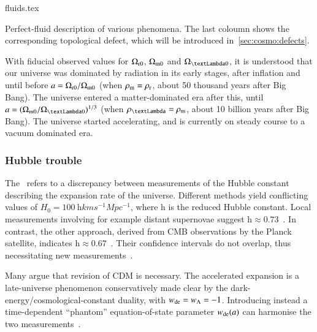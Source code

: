 \begin{table}[h]
    {{fluids.tex}
    \caption{Perfect-fluid description of various phenomena. The last coloumn shows the corresponding topological defect, which will be introduced in~\cref{sec:cosmo:defects}.}
    \label{tab:GR:lcdm:fluids}}
\end{table}

With fiducial observed values for $\Omega_\mathrm{r0}$, $\Omega_\mathrm{m0}$ and $\Omega_{\text{\textLambda}0}$, it is understood that our universe was dominated by radiation in its early stages, after inflation and until before $a=\Omega_\mathrm{r0}/\Omega_\mathrm{m0}$ (when $\rho_\mathrm{m}=\rho_\mathrm{r}$, about 50 thousand years after Big Bang). The universe entered a matter-dominated era after this, until $a=(\Omega\ped{m0}/\Omega_{\text{\textLambda}0})^{1/3}$ (when $\rho_{\text{\textLambda}}=\rho\ped{m}$, about 10 billion years after Big Bang). The universe started accelerating, and is currently on steady course to a vacuum dominated era. 


\subsubsection{Hubble trouble}
    The~ refers to a discrepancy between measurements of the Hubble constant describing the expansion rate of the universe. Different methods yield conflicting values of $H_0 = 100~ \mathrm{h} \unit{km} \unit{s^{-1}} \unit{Mpc^{-1}}$, where $\mathrm{h}$ is the reduced Hubble constant. Local measurements involving for example distant supernovae suggest $\mathrm{h} \approx 0.73$~\citep[e.g.][]{maggioreGravitationalWavesVol2018}. In contrast, the other approach, derived from CMB observations by the Planck satellite, indicates $\mathrm{h}\approx 0.67$~\citep[e.g.][]{maggioreGravitationalWavesVol2018}. Their confidence intervals do not overlap, thus necessitating new measurements~\citep[e.g.][]{maggioreGravitationalWavesVol2018}. 


    Many argue that revision of \textLambda{}CDM is necessary. The accelerated expansion is a late-universe phenomenon conservatively made clear by the dark-energy/cosmological-constant duality, with $w_\mathrm{de}=w_{\Lambda}=-1$. %
    Introducing instead a time-dependent ``phantom'' equation-of-state parameter $w_\mathrm{de}(a)$ can harmonise the two measurements~\citep{maggioreGravitationalWavesVol2018}. %








